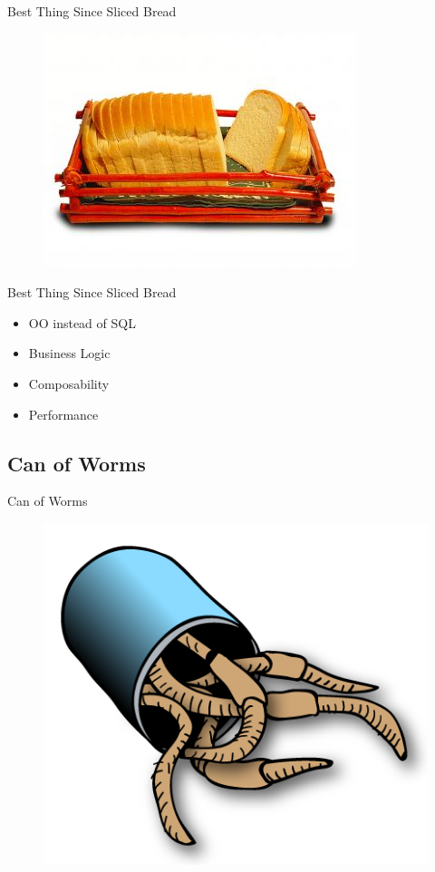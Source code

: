 \begin{frame}{Best Thing Since Sliced Bread}


\begin{figure}[!ht]
\centering
\includegraphics[width=1\linewidth]{img/sliced-bread.jpg}
\end{figure}
\end{frame}

\begin{frame}{Best Thing Since Sliced Bread}
\begin{itemize}
\item OO instead of SQL
\item Business Logic
\item Composability
\item Performance
\end{itemize}
\end{frame}

\subsection{Can of Worms}

\begin{frame}{Can of Worms}
\begin{figure}[!ht]
\centering
\includegraphics[width=0.75\linewidth]{img/canofworms.png}
\end{figure}
\end{frame}

